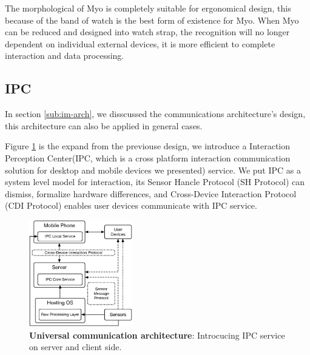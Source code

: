 The morphological of Myo is completely suitable for ergonomical design, this because of the band of watch is the best form of existence for Myo. When Myo can be reduced and designed into watch strap, the recognition will no longer dependent on individual external devices, it is more efficient to complete interaction and data processing.

\subsection{IPC}

In section \ref{sub:im-arch}, we disscussed the communications architecture's design, this architecture can also be applied in general cases.

Figure \ref{fig:universe-arch} is the expand from the previouse design, we introduce a Interaction Perception Center(IPC, which is a cross platform interaction communication solution for desktop and mobile devices we presented) service\cite{Changkun:2015ipc}. We put IPC as a system level model for interaction, its Sensor Hancle Protocol (SH Protocol) can dismiss, formalize hardware differences, and Cross-Device Interaction Protocol (CDI Protocol) enables user devices communicate with IPC service.

\begin{figure}[H]
    \kaishu
    \centering
    \includegraphics[width=0.4\textwidth]{figures/universe-arch}
    \caption{\kaishu \textbf{Universal communication architecture}: Introcucing IPC service on server and client side.}
    \label{fig:universe-arch}
\end{figure}

